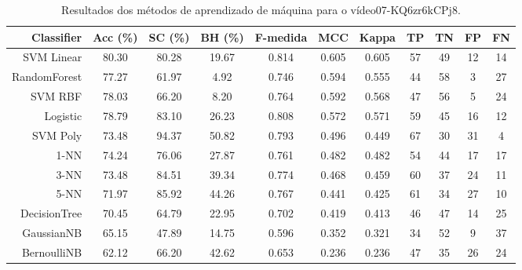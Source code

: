 \begin{table}[!htb]
\centering
\caption{Resultados dos métodos de aprendizado de máquina para o vídeo07-KQ6zr6kCPj8.}
\label{tab:07-KQ6zr6kCPj8}
\begin{tabular}{r|c|c|c|c|c|c|c|c|c|c}
\hline\hline
Classifier & Acc (\%) & SC (\%) & BH (\%) & F-medida & MCC & Kappa & TP & TN & FP & FN \\ \hline
SVM Linear & 80.30 & 80.28 & 19.67 & 0.814 & 0.605 & 0.605 & 57 & 49 & 12 & 14 \\ 
RandomForest & 77.27 & 61.97 & 4.92 & 0.746 & 0.594 & 0.555 & 44 & 58 & 3 & 27 \\ 
SVM RBF & 78.03 & 66.20 & 8.20 & 0.764 & 0.592 & 0.568 & 47 & 56 & 5 & 24 \\ 
Logistic & 78.79 & 83.10 & 26.23 & 0.808 & 0.572 & 0.571 & 59 & 45 & 16 & 12 \\ 
SVM Poly & 73.48 & 94.37 & 50.82 & 0.793 & 0.496 & 0.449 & 67 & 30 & 31 & 4 \\ 
1-NN & 74.24 & 76.06 & 27.87 & 0.761 & 0.482 & 0.482 & 54 & 44 & 17 & 17 \\ 
3-NN & 73.48 & 84.51 & 39.34 & 0.774 & 0.468 & 0.459 & 60 & 37 & 24 & 11 \\ 
5-NN & 71.97 & 85.92 & 44.26 & 0.767 & 0.441 & 0.425 & 61 & 34 & 27 & 10 \\ 
DecisionTree & 70.45 & 64.79 & 22.95 & 0.702 & 0.419 & 0.413 & 46 & 47 & 14 & 25 \\ 
GaussianNB & 65.15 & 47.89 & 14.75 & 0.596 & 0.352 & 0.321 & 34 & 52 & 9 & 37 \\ 
BernoulliNB & 62.12 & 66.20 & 42.62 & 0.653 & 0.236 & 0.236 & 47 & 35 & 26 & 24 \\ 
\hline\hline
\end{tabular}
\end{table}
